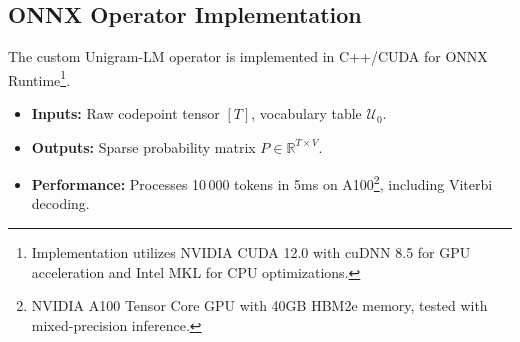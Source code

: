 \subsection{ONNX Operator Implementation}
\label{sec:onnx-op}

The custom Unigram-LM operator is implemented in C++/CUDA for ONNX Runtime\footnote{Implementation utilizes NVIDIA CUDA 12.0 with cuDNN 8.5 for GPU acceleration and Intel MKL for CPU optimizations.}.  
\begin{itemize}[leftmargin=1.5em]
	\item \textbf{Inputs:} Raw codepoint tensor $[T]$, vocabulary table $\mathcal U_0$.
	\item \textbf{Outputs:} Sparse probability matrix $P\in\mathbb{R}^{T\times V}$.
	\item \textbf{Performance:} Processes 10\,000 tokens in 5ms on A100\footnote{NVIDIA A100 Tensor Core GPU with 40GB HBM2e memory, tested with mixed-precision inference.}, including Viterbi decoding.
\end{itemize}
